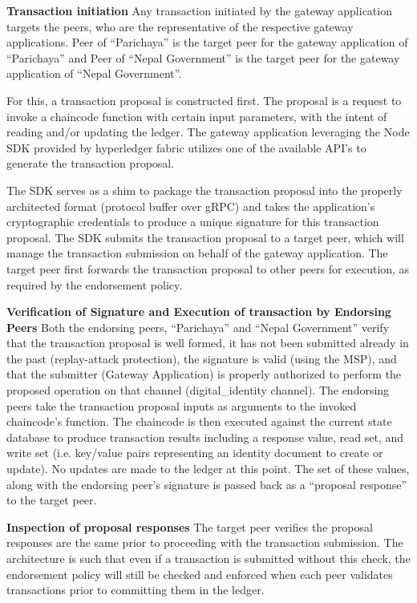 \textbf{Transaction initiation} \newline
Any transaction initiated by the gateway application targets the peers, who are the representative of the respective gateway applications. Peer of “Parichaya” is the target peer for the gateway application of “Parichaya” and Peer of “Nepal Government” is the target peer for the gateway application of “Nepal Government”.

For this, a transaction proposal is constructed first. The proposal is a request to invoke a chaincode function with certain input parameters, with the intent of reading and/or updating the ledger. The gateway application leveraging the Node SDK provided by hyperledger fabric utilizes one of the available API’s to generate the transaction proposal.

The SDK serves as a shim to package the transaction proposal into the properly architected format (protocol buffer over gRPC) and takes the application’s cryptographic credentials to produce a unique signature for this transaction proposal. The SDK submits the transaction proposal to a target peer, which will manage the transaction submission on behalf of the gateway application. The target peer first forwards the transaction proposal to other peers for execution, as required by the endorsement policy.\\ \newline

\textbf{Verification of Signature and Execution of transaction by Endorsing Peers} \newline
Both the endorsing peers, “Parichaya” and “Nepal Government” verify that the transaction proposal is well formed,  it has not been submitted already in the past (replay-attack protection),  the signature is valid (using the MSP), and  that the submitter (Gateway Application) is properly authorized to perform the proposed operation on that channel (digital\_identity channel). The endorsing peers take the transaction proposal inputs as arguments to the invoked chaincode’s function. The chaincode is then executed against the current state database to produce transaction results including a response value, read set, and write set (i.e. key/value pairs representing an identity document to create or update). No updates are made to the ledger at this point. The set of these values, along with the endorsing peer’s signature is passed back as a “proposal response” to the target peer.

\textbf{Inspection of proposal responses} \newline
The target peer verifies the proposal responses are the same prior to proceeding with the transaction submission. The architecture is such that even if a transaction is submitted without this check, the endorsement policy will still be checked and enforced when each peer validates transactions prior to committing them in the ledger.


